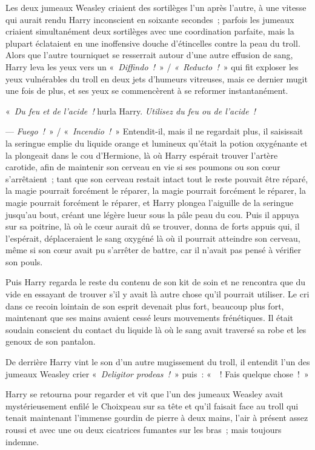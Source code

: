 Les deux jumeaux Weasley criaient des sortilèges l'un après l'autre, à une vitesse qui aurait rendu Harry inconscient en soixante secondes~; parfois les jumeaux criaient simultanément deux sortilèges avec une coordination parfaite, mais la plupart éclataient en une inoffensive douche d'étincelles contre la peau du troll. Alors que l'autre tourniquet se resserrait autour d'une autre effusion de sang, Harry leva les yeux vers un «~\emph{Diffindo~!}~» / \emph{«~Reducto~!}~» qui fit exploser les yeux vulnérables du troll en deux jets d'humeurs vitreuses, mais ce dernier mugit une fois de plus, et ses yeux se commencèrent à se reformer instantanément.

«~\emph{Du feu et de l'acide~!} hurla Harry. \emph{Utilisez du feu ou de l'acide~!}

--- \emph{Fuego~!}~» / «~\emph{Incendio~!}~» Entendit-il, mais il ne regardait plus, il saisissait la seringue emplie du liquide orange et lumineux qu'était la potion oxygénante et la plongeait dans le cou d'Hermione, là où Harry espérait trouver l'artère carotide, afin de maintenir son cerveau en vie si ses poumons ou son cœur s'arrêtaient~; tant que son cerveau restait intact tout le reste pouvait être réparé, la magie pourrait forcément le réparer, la magie pourrait forcément le réparer, la magie pourrait forcément le réparer, et Harry plongea l'aiguille de la seringue jusqu'au bout, créant une légère lueur sous la pâle peau du cou. Puis il appuya sur sa poitrine, là où le cœur aurait dû se trouver, donna de forts appuis qui, il l'espérait, déplaceraient le sang oxygéné là où il pourrait atteindre son cerveau, même si son cœur avait pu s'arrêter de battre, car il n'avait pas pensé à vérifier son pouls.

Puis Harry regarda le reste du contenu de son kit de soin et ne rencontra que du vide en essayant de trouver s'il y avait là autre chose qu'il pourrait utiliser. Le cri dans ce recoin lointain de son esprit devenait plus fort, beaucoup plus fort, maintenant que ses mains avaient cessé leurs mouvements frénétiques. Il était soudain conscient du contact du liquide là où le sang avait traversé sa robe et les genoux de son pantalon.

De derrière Harry vint le son d'un autre mugissement du troll, il entendit l'un des jumeaux Weasley crier «~\emph{Deligitor prodeas~!}~» puis~: «~~! Fais quelque chose~!~»

Harry se retourna pour regarder et vit que l'un des jumeaux Weasley avait mystérieusement enfilé le Choixpeau sur sa tête et qu'il faisait face au troll qui tenait maintenant l'immense gourdin de pierre à deux mains, l'air à présent assez roussi et avec une ou deux cicatrices fumantes sur les bras~; mais toujours indemne.

